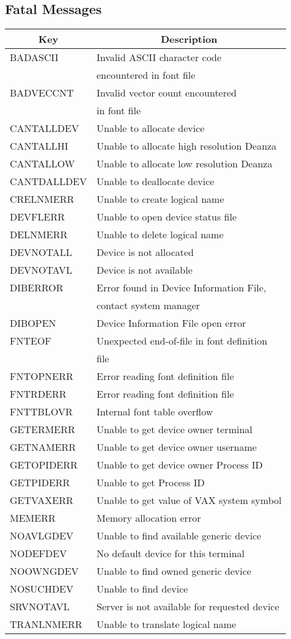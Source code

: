 \subsection{Fatal Messages}
\begin{tabular}{|l|l|}
\hline
\multicolumn{1}{|c|}{Key}
&\multicolumn{1}{|c|}{Description}\\ \hline
BADASCII & Invalid ASCII character code\\
& encountered in font file\\
BADVECCNT & Invalid vector count encountered\\
& in font file\\
CANTALLDEV & Unable to allocate device\\
CANTALLHI & Unable to allocate high resolution Deanza\\
CANTALLOW & Unable to allocate low resolution Deanza\\
CANTDALLDEV & Unable to deallocate device\\
CRELNMERR & Unable to create logical name\\
DEVFLERR & Unable to open device status file\\
DELNMERR & Unable to delete logical name\\
DEVNOTALL & Device is not allocated\\
DEVNOTAVL & Device is not available\\
DIBERROR & Error found in Device Information File,\\
& contact system manager\\
DIBOPEN & Device Information File open error\\
FNTEOF & Unexpected end-of-file in font definition\\
& file\\
FNTOPNERR & Error reading font definition file\\
FNTRDERR & Error reading font definition file\\
FNTTBLOVR & Internal font table overflow\\ 
GETERMERR & Unable to get device owner terminal\\
GETNAMERR & Unable to get device owner username\\
GETOPIDERR & Unable to get device owner Process ID\\
GETPIDERR & Unable to get Process ID\\
GETVAXERR & Unable to get value of VAX system symbol\\
MEMERR & Memory allocation error\\
NOAVLGDEV & Unable to find available generic device\\
NODEFDEV & No default device for this terminal\\
NOOWNGDEV & Unable to find owned generic device\\
NOSUCHDEV & Unable to find device\\
SRVNOTAVL & Server is not available for requested device\\
TRANLNMERR & Unable to translate logical name\\
\hline
\end{tabular}
\newpage
